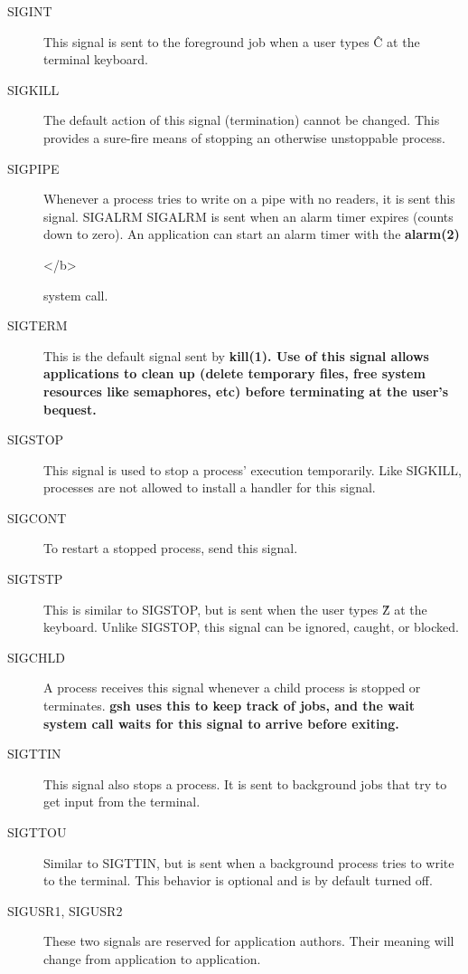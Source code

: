 \documentclass{report}
\begin{document}
\begin{description}
\item[SIGINT]
	This signal is sent to the
        foreground job when a user types \^C at the terminal
        keyboard.
\item[SIGKILL]
	The default
	action of this signal (termination) cannot be changed.
	This provides a sure-fire means of stopping an otherwise
	unstoppable process.
\item[SIGPIPE]
	Whenever a process tries to
        write on a pipe with no readers, it is sent this signal.
        SIGALRM SIGALRM is sent when an
        alarm timer expires (counts down to zero). An application
        can start an alarm timer with the
	\bf alarm\rm(2) 
	\begin{rawhtml}
	</b>
	\end{rawhtml}
	\rm system call.
\item[SIGTERM]
	This is the default signal
        sent by \bf kill\rm(1). Use of this signal allows
        applications to clean up (delete temporary files, free
        system resources like semaphores, etc) before terminating
        at the user's bequest. 
\item[SIGSTOP]
	This signal is used to stop
        a process' execution temporarily. Like SIGKILL, processes
        are not allowed to install a handler for this signal. 
\item[SIGCONT]
	To restart a stopped process, send this signal. 
\item[SIGTSTP]
	This is similar to SIGSTOP,
        but is sent when the user types \^Z at the keyboard.
        Unlike SIGSTOP, this signal can be ignored, caught, or
        blocked. 
\item[SIGCHLD]
	A process receives this
        signal whenever a child process is stopped or terminates.
        \bf gsh \rm uses this to keep track of jobs, and the wait
        system call waits for this signal to arrive before
        exiting. 
\item[SIGTTIN]
	This signal also stops a process. It is sent to  
	background jobs that try to get input from the terminal. 
\item[SIGTTOU]
	Similar to SIGTTIN, but is
        sent when a background process tries to write to the
        terminal. This behavior is optional and is by default
        turned off. 
\item[SIGUSR1, SIGUSR2]
	These two signals are
        reserved for application authors. Their meaning will
        change from application to application.
\end{description}
\end{document}
